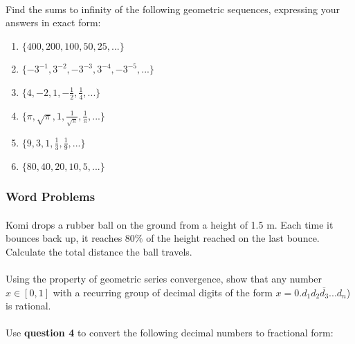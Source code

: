 \documentclass[12pt, a4paper, titlepage, twoside]{article}
\begin{document}
	\paragraph{}
	 Find the sums to infinity of the following geometric sequences, expressing your answers in exact
	form:
	
	\begin{multicols}{2}
		\begin{enumerate}[label=\textbf{(\alph*)}]
			\item $\{400, 200, 100, 50, 25,...\}$
			\item $\{-3^{-1}, 3^{-2}, -3^{-3}, 3^{-4}, -3^{-5}, ...\}$
			\item $\{4, -2, 1, -\frac{1}{2}, \frac{1}{4},...\}$
			\item $\{\pi, \sqrt{\pi}, 1, \frac{1}{\sqrt{\pi}}, \frac{1}{\pi}, ...\}$
			\item $\{9, 3, 1, \frac{1}{3}, \frac{1}{9},...\}$
			\item $\{80, 40, 20, 10, 5,...\}$
		\end{enumerate}
	\end{multicols}
	
	\subsubsection*{Word Problems}	
	
	\paragraph{}
	 Komi drops a rubber ball on the ground from a height of 1.5 m. Each time it bounces back up, it reaches
	$80\%$ of the height reached on the last bounce. Calculate the total distance the ball travels.
	
	\paragraph{}
	 Using the property of geometric series convergence, show that any number $x \in [0,1]$
	with a recurring group of decimal digits of the form $x = 0.\overline{d_1 d_2 d_3 ... d_n}$) is rational.
	
	\paragraph{}
	 Use \textbf{question 4} to convert the following decimal numbers to fractional form:
	
\end{document}
